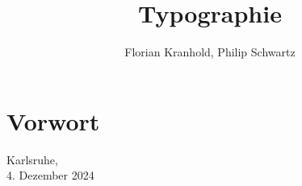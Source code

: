 \documentclass[british,ngerman]{scrbook}
\author{Florian Kranhold, Philip Schwartz}
\title {Typographie}
\begin{document}
\frontmatter


\chapter*{Vorwort}
\lipsum[1-2]

\begin{flushright}
  Karlsruhe,\\4. Dezember 2024
\end{flushright}

\mainmatter




\end{document}

